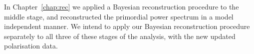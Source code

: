 \begin{center}
\end{center}

In Chapter~\ref{chap:rec} we applied a Bayesian reconstruction procedure to the middle stage, and reconstructed the primordial power spectrum in a model independent manner.  
We intend to apply our Bayesian reconstruction procedure separately to all three of these stages of the analysis, with the new updated polarisation data.

